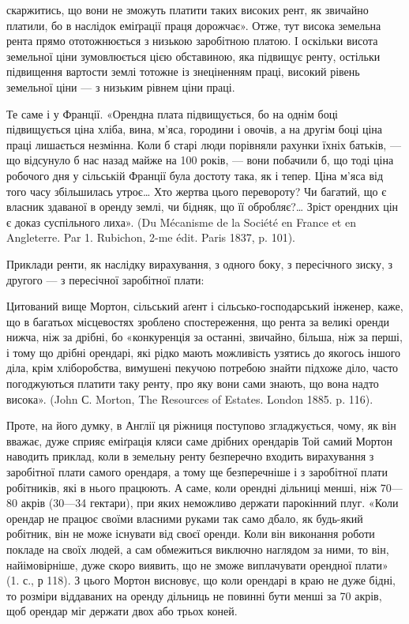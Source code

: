 \parcont{}  %
скаржитись, що вони не зможуть платити таких високих рент, як звичайно
платили, бо в наслідок еміґрації праця дорожчає». Отже, тут висока земельна
рента прямо ототожнюється з низькою заробітною платою. І оскільки висота
земельної ціни зумовлюється цією обставиною, яка підвищує ренту, остільки підвищення
вартости землі тотожне із знеціненням праці, високий рівень земельної
ціни — з низьким рівнем ціни праці.

Те саме і у Франції. «Орендна плата підвищується, бо на однім боці підвищується
ціна хліба, вина, м’яса, городини і овочів, а на другім боці ціна
праці лишається незмінна. Коли б старі люди порівняли рахунки їхніх батьків, —
що відсунуло б нас назад майже на 100 років, — вони побачили б, що тоді ціна
робочого дня у сільській Франції була достоту така, як і тепер. Ціна м’яса від того
часу збільшилась утроє\dots{} Хто жертва цього перевороту? Чи багатий, що є власник
здаваної в оренду землі, чи бідняк, що її обробляє?\dots{} Зріст орендних
цін є доказ суспільного лиха». (Du Mécanisme de la Société en France et en
Angleterre. Par 1. Rubichon, 2-me édit. Paris 1837, p. 101).

Приклади ренти, як наслідку вирахування, з одного боку, з пересічного
зиску, з другого — з пересічної заробітної плати:

Цитований вище Мортон, сільський аґент і сільсько-господарський інженер,
каже, що в багатьох місцевостях зроблено спостереження, що рента
за великі оренди нижча, ніж за дрібні, бо «конкуренція за останні, звичайно,
більша, ніж за перші, і тому що дрібні орендарі, які рідко мають можливість
узятись до якогось іншого діла, крім хліборобства, вимушені пекучою потребою
знайти підхоже діло, часто погоджуються платити таку ренту, про яку вони
сами знають, що вона надто висока». (John С. Morton, The Resources of Estates.
London 1885. p. 116).

Проте, на його думку, в Англії ця ріжниця поступово згладжується, чому,
як він вважає, дуже сприяє еміґрація кляси саме дрібних орендарів Той самий
Мортон наводить приклад, коли в земельну ренту безперечно входить вирахування
з заробітної плати самого орендаря, а тому ще безперечніше і з заробітної
плати робітників, які в нього працюють. А саме, коли орендні дільниці
менші, ніж 70—80 акрів (30—34 гектари), при яких неможливо держати парокінний
плуг. «Коли орендар не працює своїми власними руками так само
дбало, як будь-який робітник, він не може існувати від своєї оренди. Коли він
виконання роботи покладе на своїх людей, а сам обмежиться виключно наглядом
за ними, то він, найімовірніше, дуже скоро виявить, що не зможе виплачувати
орендної плати» (1. с., р 118). З цього Мортон висновує, що коли орендарі
в краю не дуже бідні, то розміри віддаваних на оренду дільниць не повинні
бути менші за 70 акрів, щоб орендар міг держати двох або трьох коней.


